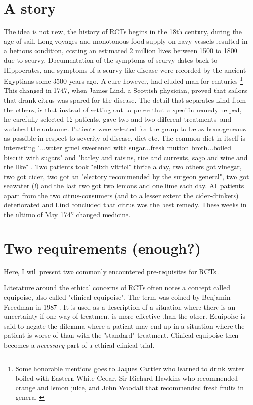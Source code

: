 \documentclass[12p]{article}
\begin{document}
\section*{A story}

The idea is not new, the history of RCTs begins in the 18th century, during the age of sail.
Long voyages and monotonous food-supply on navy vessels resulted in a heinous condition, costing an estimated 2 million lives between 1500 to 1800 due to scurvy.
Documentation of the symptoms of scurvy dates back to Hippocrates, and symptoms of a scurvy-like disease were recorded by the ancient Egyptians some 3500 years ago.
A cure however, had eluded man for centuries \footnote{Some honorable mentions goes to Jaques Cartier who learned to drink water boiled with Eastern White Cedar, Sir Richard Hawkins who recommended orange and lemon juice, and John Woodall that recommended fresh fruits in general \cite{curiosascurvy}}
This changed in 1747, when James Lind, a Scottish physician, proved that sailors that drank citrus was spared for the disease.
The detail that separates Lind from the others, is that instead of setting out to prove that a specific remedy helped, he carefully selected 12 patients, gave two and two different treatments, and watched the outcome.
Patients were selected for the group to be as homogeneous as possible in respect to severity of disease, diet etc.
The common diet in itself is interesting "...water gruel sweetened with sugar...fresh mutton broth...boiled biscuit with sugars" and "barley and raisins, rice and currents, sago and wine and the like" \cite{lind}.
Two patients took "elixir vitriol" thrice a day, two others got vinegar, two got cider, two got an "electory recommended by the surgeon general", two got seawater (!) and the last two got two lemons and one lime each day.
All patients apart from the two citrus-consumers (and to a lesser extent the cider-drinkers) deteriorated and Lind concluded that citrus was the best remedy.
These weeks in the ultimo of May 1747 changed medicine.

\section*{Two requirements (enough?)}

Here, I will present two commonly encountered pre-requisites for RCTs \cite{nadineth}.

Literature around the ethical concerns of RCTs often notes a concept called equipoise, also called "clinical equipoise".
The term was coined by Benjamin Freedman in 1987 \cite{freedmaneq}.
It is used as a description of a situation where there is an uncertainty if one way of treatment is more effective than the other.
Equipoise is said to negate the dilemma where a patient may end up in a situation where the patient is worse of than with the "standard" treatment.
Clinical equipoise then becomes a \emph{necessary} part of a ethical clinical trial.
\end{document}
